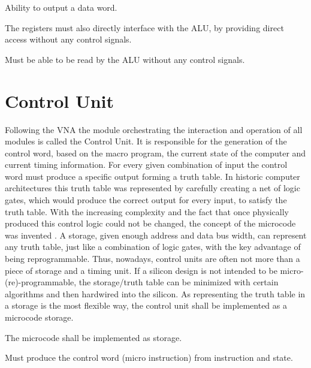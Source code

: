 \begin{feat-requirement}
  Ability to output a data word.
\end{feat-requirement}

The registers must also directly interface with the ALU, by providing direct access without any control signals. 

\begin{arch-requirement} \label{req:register-direct-access}
  Must be able to be read by the ALU without any control signals.
\end{arch-requirement}


\section{Control Unit}
Following the VNA the module orchestrating the interaction and operation of all modules is called the Control Unit. It is responsible for the generation of the control word, based on the macro program, the current state of the computer and current timing information. For every given combination of input the control word must produce a specific output forming a truth table. In historic computer architectures this truth table was represented by carefully creating a net of logic gates, which would produce the correct output for every input, to satisfy the truth table. With the increasing complexity and the fact that once physically produced this control logic could not be changed, the concept of the microcode was invented \cite{cite.needed}. A storage, given enough address and data bus width, can represent any truth table, just like a combination of logic gates, with the key advantage of being reprogrammable. Thus, nowadays, control units are often not more than a piece of storage and a timing unit. If a silicon design is not intended to be micro-(re)-programmable, the storage/truth table can be minimized with certain algorithms and then hardwired into the silicon. As representing the truth table in a storage is the most flexible way, the control unit shall be implemented as a microcode storage.

\begin{arch-requirement}
  The microcode shall be implemented as storage.
\end{arch-requirement}

\begin{arch-requirement} \label{req:cw-from-instr}
  Must produce the control word (micro instruction) from instruction and state.
\end{arch-requirement}

